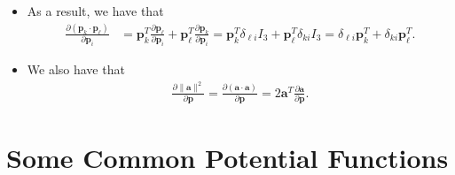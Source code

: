\documentclass[10pt]{article}
\newcommand{\ve}[1]{\mathbf{#1}}
\begin{document}
\begin{itemize}
    \item As a result, we have that
    \begin{align*}
      \frac{\partial (\ve{p}_k \cdot \ve{p}_\ell)}{\partial \ve{p}_i}
      &= \ve{p}_k^T \frac{\partial \ve{p}_\ell}{\partial \ve{p}_i} + \ve{p}_\ell^T \frac{\partial \ve{p}_k}{\partial \ve{p}_i}
      = \ve{p}_k^T \delta_{\ell i} I_3 + \ve{p}_\ell^T \delta_{ki} I_3
      = \delta_{\ell i} \ve{p}_k^T + \delta_{ki} \ve{p}_\ell^T.
    \end{align*}

    \item We also have that
    \begin{align*}
      \frac{\partial \| \ve{a} \|^2}{\partial \ve{p}} = \frac{\partial(\ve{a} \cdot \ve{a})}{\partial \ve{p}} = 2 \ve{a}^T \frac{\partial \ve{a}}{\partial \ve{p}}.
    \end{align*}
  \end{itemize}

  \section{Some Common Potential Functions} %
  \label{sec:some_commont_potential_functions}
\end{document}
